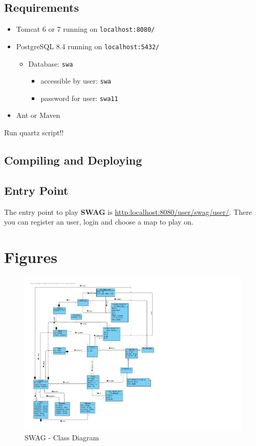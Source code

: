 \documentclass[11pt]{article}
\begin{document}
\subsection{Requirements}

\begin{itemize}
\item Tomcat 6 or 7 running on \texttt{localhost:8080/}
\item PostgreSQL 8.4 running on \texttt{localhost:5432/}
	\begin{itemize}
	\item Database: \texttt{swa}
		\begin{itemize}
		\item accessible by user: \texttt{swa}
		\item password for user: \texttt{swa11}
		\end{itemize}
	\end{itemize}
\item Ant or Maven
\end{itemize}

Run quartz script!!

\subsection{Compiling and Deploying}

\subsection{Entry Point}

The entry point to play \textbf{SWAG} is \href{http:localhost:8080/user/swag/user/}{http:localhost:8080/user/swag/user/}. There you can register an user, login and choose a map to play on.

\newpage

\appendix
\section{Figures}

\begin{figure}[h]
\center
\includegraphics[scale=0.9]{diagrams/SWAG_Class_Diagram.pdf}
\caption{SWAG - Class Diagram}
\label{fig:class}
\end{figure}
\end{document}
